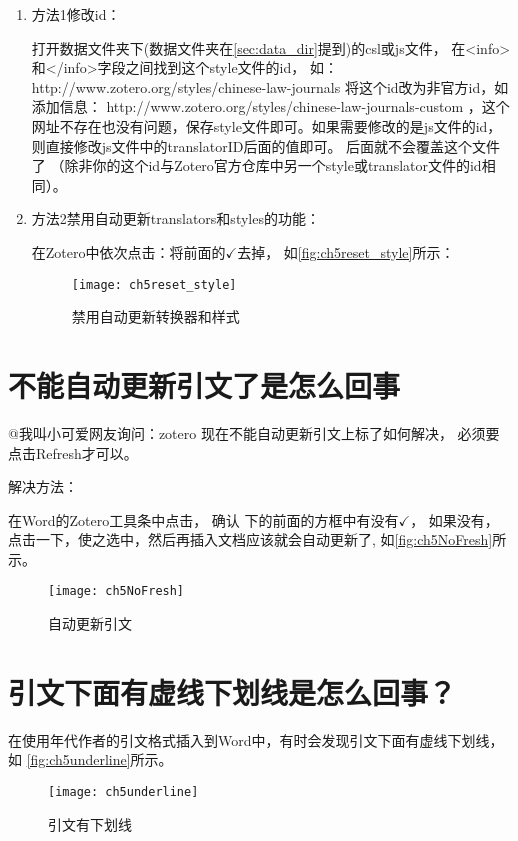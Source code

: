 \documentclass[theorem=false,mathfont=none,openany,sub3section]{easybook}
\begin{document}
{\begin{enumerate}
	\item 方法1修改id：
	
	打开数据文件夹下(数据文件夹在\cref{sec:data_dir}提到)的csl或js文件，
	在<info>和</info>字段之间找到这个style文件的id，
	如：http://www.zotero.org/styles/chinese-law-journals
	将这个id改为非官方id，如添加信息：			
	http://www.zotero.org/styles/chinese-law-journals-custom
	，这个网址不存在也没有问题，保存style文件即可。如果需要修改的是js文件的id，
	则直接修改js文件中的translatorID后面的值即可。
	后面就不会覆盖这个文件了
	（除非你的这个id与Zotero官方仓库中另一个style或translator文件的id相同）。
	\item 方法2禁用自动更新translators和styles的功能：
	
	在Zotero中依次点击：将前面的$\checkmark$去掉，
	如\autoref{fig:ch5reset_style}所示：
	\begin{figure}[htbp]
		\centering
		\texttt{[image: ch5reset\_style]}
		\caption{禁用自动更新转换器和样式}
		\label{fig:ch5reset_style}
	\end{figure}
\end{enumerate}

\section{不能自动更新引文了是怎么回事}\label{sec:norefresh}
@我叫小可爱网友询问：zotero 现在不能自动更新引文上标了如何解决，
必须要点击Refresh才可以。

解决方法：

在Word的Zotero工具条中点击，
确认
下的前面的方框中有没有$\checkmark$，
如果没有，点击一下，使之选中，然后再插入文档应该就会自动更新了,
如\autoref{fig:ch5NoFresh}所示。
\begin{figure}[htbp]
	\centering
	\texttt{[image: ch5NoFresh]}
	\caption{自动更新引文}
	\label{fig:ch5NoFresh}
\end{figure}

\section{引文下面有虚线下划线是怎么回事？}\label{sec:citationUnderline}
在使用年代作者的引文格式插入到Word中，有时会发现引文下面有虚线下划线，如
\autoref{fig:ch5underline}所示。
\begin{figure}[htbp]
	\centering
	\texttt{[image: ch5underline]}
	\caption{引文有下划线}
	\label{fig:ch5underline}
\end{figure}

}
\end{document}
